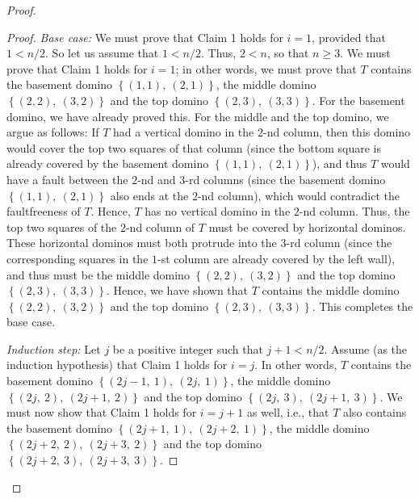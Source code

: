 \begin{fineprint}
\begin{proof}
\begin{proof}
\textit{Base case:} We must prove that Claim 1 holds for $i=1$, provided that
$1<n/2$. So let us assume that $1<n/2$. Thus, $2<n$, so that $n\geq3$. We must
prove that Claim 1 holds for $i=1$; in other words, we must prove that $T$
contains the basement domino $\left\{  \left(  1,1\right)  ,\ \left(
2,1\right)  \right\}  $, the middle domino $\left\{  \left(  2,2\right)
,\ \left(  3,2\right)  \right\}  $ and the top domino $\left\{  \left(
2,3\right)  ,\ \left(  3,3\right)  \right\}  $. For the basement domino, we
have already proved this. For the middle and the top domino, we argue as
follows: If $T$ had a vertical domino in the $2$-nd column, then this domino
would cover the top two squares of that column (since the bottom square is
already covered by the basement domino $\left\{  \left(  1,1\right)
,\ \left(  2,1\right)  \right\}  $), and thus $T$ would have a fault between
the $2$-nd and $3$-rd columns (since the basement domino $\left\{  \left(
1,1\right)  ,\ \left(  2,1\right)  \right\}  $ also ends at the $2$-nd
column), which would contradict the faultfreeness of $T$. Hence, $T$ has no
vertical domino in the $2$-nd column. Thus, the top two squares of the $2$-nd
column of $T$ must be covered by horizontal dominos. These horizontal dominos
must both protrude into the $3$-rd column (since the corresponding squares in
the $1$-st column are already covered by the left wall), and thus must be the
middle domino $\left\{  \left(  2,2\right)  ,\ \left(  3,2\right)  \right\}  $
and the top domino $\left\{  \left(  2,3\right)  ,\ \left(  3,3\right)
\right\}  $. Hence, we have shown that $T$ contains the middle domino
$\left\{  \left(  2,2\right)  ,\ \left(  3,2\right)  \right\}  $ and the top
domino $\left\{  \left(  2,3\right)  ,\ \left(  3,3\right)  \right\}  $. This
completes the base case.

\textit{Induction step:} Let $j$ be a positive integer such that $j+1<n/2$.
Assume (as the induction hypothesis) that Claim 1 holds for $i=j$. In other
words, $T$ contains the basement domino $\left\{  \left(  2j-1,\ 1\right)
,\ \left(  2j,\ 1\right)  \right\}  $, the middle domino $\left\{  \left(
2j,\ 2\right)  ,\ \left(  2j+1,\ 2\right)  \right\}  $ and the top domino
$\left\{  \left(  2j,\ 3\right)  ,\ \left(  2j+1,\ 3\right)  \right\}  $. We
must now show that Claim 1 holds for $i=j+1$ as well, i.e., that $T$ also
contains the basement domino $\left\{  \left(  2j+1,\ 1\right)  ,\ \left(
2j+2,\ 1\right)  \right\}  $, the middle domino $\left\{  \left(
2j+2,\ 2\right)  ,\ \left(  2j+3,\ 2\right)  \right\}  $ and the top domino
$\left\{  \left(  2j+2,\ 3\right)  ,\ \left(  2j+3,\ 3\right)  \right\}  $.


\end{proof}
\end{proof}
\end{fineprint}
